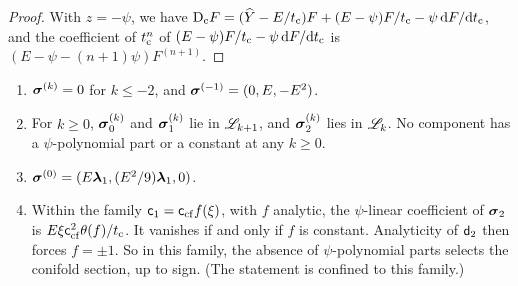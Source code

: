 \begin{proof}
With $z=-\psi$, we have $\mathrm{D}_{\mathrm{c}} F=(\widehat{Y}-E/t_{\mathrm{c}})F+(E-\psi)F/t_{\mathrm{c}}-\psi\,\mathrm{d} F/\mathrm{d}t_{\mathrm{c}}$, and the coefficient of $t_{\mathrm{c}}^n$ of $(E-\psi)F/t_{\mathrm{c}}-\psi\,\mathrm{d} F/\mathrm{d}t_{\mathrm{c}}$ is $(E-\psi-(n+1)\psi)F^{(n+1)}$.
\end{proof}

\begin{prop}\label{prop:lea-H2}
\leavevmode
\begin{enumerate}
\item[(a)] $\boldsymbol{\sigma}^{(k)}=0$ for $k\le-2$, and $\boldsymbol{\sigma}^{(-1)}=(0,E,-E^2)$.
\item[(b)] For $k\ge0$, $\boldsymbol{\sigma}_0^{(k)}$ and $\boldsymbol{\sigma}_1^{(k)}$ lie in $\mathscr{L}_{k+1}$, and $\boldsymbol{\sigma}_2^{(k)}$ lies in $\mathscr{L}_k$. No component has a $\psi$-polynomial part or a constant at any $k\ge0$.
\item[(c)] $\boldsymbol{\sigma}^{(0)}=(E\boldsymbol{\lambda}_1,(E^2/9)\boldsymbol{\lambda}_1,0)$.
\item[(d)] Within the family $\mathsf{c}_{1}=\mathsf{c}_{\mathrm{cf}} f(\xi)$, with $f$ analytic, the $\psi$-linear coefficient of $\boldsymbol{\sigma}_2$ is $E\xi\mathsf{c}_{\mathrm{cf}}^2\theta(f)/t_{\mathrm{c}}$. It vanishes if and only if $f$ is constant. Analyticity of $\mathsf{d}_{2}$ then forces $f=\pm1$. So in this family, the absence of $\psi$-polynomial parts selects the conifold section, up to sign. (The statement is confined to this family.)
\end{enumerate}
\end{prop}

